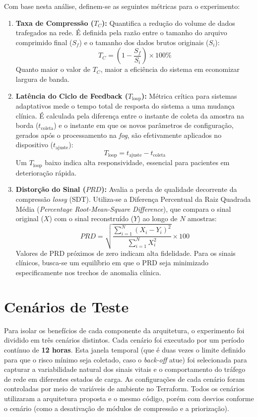 \documentclass[twoside,english,brazilian]{UNISINOSmonografia}
\begin{document}
Com base nesta análise, definem-se as seguintes métricas para o experimento:

\begin{enumerate}
    \item \textbf{Taxa de Compressão ($T_C$):} Quantifica a redução do volume de dados trafegados na rede. É definida pela razão entre o tamanho do arquivo comprimido final ($S_f$) e o tamanho dos dados brutos originais ($S_i$):
    \[
    T_C = \left( 1 - \frac{S_f}{S_i} \right) \times 100\%
    \]
    Quanto maior o valor de $T_C$, maior a eficiência do sistema em economizar largura de banda.

    \item \textbf{Latência do Ciclo de Feedback ($T_{\text{loop}}$):} Métrica crítica para sistemas adaptativos mede o tempo total de resposta do sistema a uma mudança clínica. É calculada pela diferença entre o instante de coleta da amostra na borda ($t_{\text{coleta}}$) e o instante em que os novos parâmetros de configuração, gerados após o processamento na \textit{fog}, são efetivamente aplicados no dispositivo ($t_{\text{ajuste}}$):
    \[
    T_{\text{loop}} = t_{\text{ajuste}} - t_{\text{coleta}}
    \]
    Um $T_{\text{loop}}$ baixo indica alta responsividade, essencial para pacientes em deterioração rápida.

    \item \textbf{Distorção do Sinal ($PRD$):} Avalia a perda de qualidade decorrente da compressão \textit{lossy} (SDT). Utiliza-se a Diferença Percentual da Raiz Quadrada Média (\textit{Percentage Root-Mean-Square Difference}), que compara o sinal original ($X$) com o sinal reconstruído ($Y$) ao longo de $N$ amostras:
    \[
    PRD = \sqrt{\frac{\sum_{i=1}^{N}(X_{i} - Y_{i})^{2}}{\sum_{i=1}^{N}X_{i}^{2}}} \times 100
    \]
    Valores de PRD próximos de zero indicam alta fidelidade. Para os sinais clínicos, busca-se um equilíbrio em que o PRD seja minimizado especificamente nos trechos de anomalia clínica.
\end{enumerate}

\section{Cenários de Teste}
\label{sec:cenarios}
Para isolar os benefícios de cada componente da arquitetura, o experimento foi dividido em três cenários distintos. Cada cenário foi executado por um período contínuo de \textbf{12 horas}.  Esta janela temporal (que é duas vezes o limite definido para que o risco mínimo seja coletado, caso o \textit{back-off} atue) foi selecionada para capturar a variabilidade natural dos sinais vitais e o comportamento do tráfego de rede em diferentes estados de carga. As configurações de cada cenário foram controladas por meio de variáveis de ambiente no Terraform. Todos os cenários utilizaram a arquitetura proposta e o mesmo código, porém com desvios conforme o cenário (como a desativação de módulos de compressão e a priorização).
\end{document}
